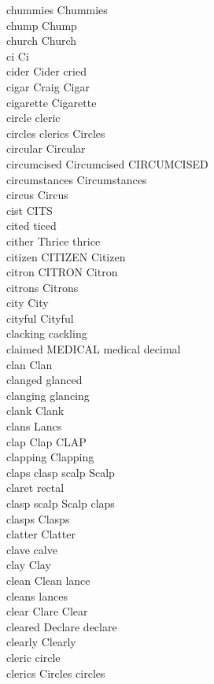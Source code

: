 chummies Chummies\\
chump Chump\\
church Church\\
ci Ci\\
cider Cider cried\\
cigar Craig Cigar\\
cigarette Cigarette\\
circle cleric\\
circles clerics Circles\\
circular Circular\\
circumcised Circumcised CIRCUMCISED\\
circumstances Circumstances\\
circus Circus\\
cist CITS\\
cited ticed\\
cither Thrice thrice\\
citizen CITIZEN Citizen\\
citron CITRON Citron\\
citrons Citrons\\
city City\\
cityful Cityful\\
clacking cackling\\
claimed MEDICAL medical decimal\\
clan Clan\\
clanged glanced\\
clanging glancing\\
clank Clank\\
clans Lancs\\
clap Clap CLAP\\
clapping Clapping\\
claps clasp scalp Scalp\\
claret rectal\\
clasp scalp Scalp claps\\
clasps Clasps\\
clatter Clatter\\
clave calve\\
clay Clay\\
clean Clean lance\\
cleans lances\\
clear Clare Clear\\
cleared Declare declare\\
clearly Clearly\\
cleric circle\\
clerics Circles circles\\
